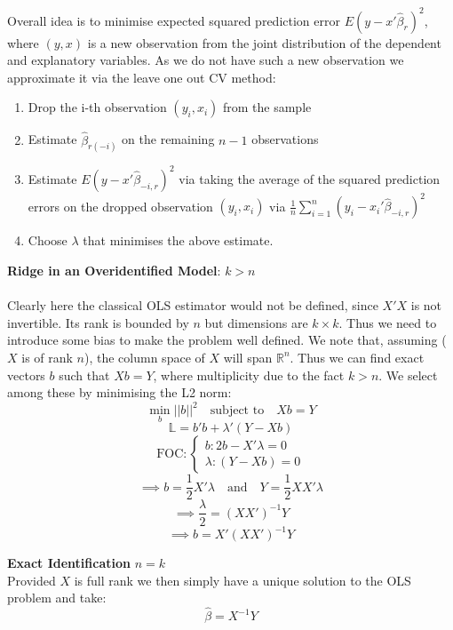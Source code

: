 \documentclass[DIV=14,titlepage=false]{scrreprt}
\begin{document}
Overall idea is to minimise expected squared prediction error \(E(y-x'\hat{\beta}_r)^2\), where \((y,x)\) is a new observation from the joint distribution of the dependent and explanatory variables.
As we do not have such a new observation we approximate it via the leave one out CV method:

\begin{enumerate}
    \item Drop the i-th observation \((y_i, x_i)\) from the sample
    \item Estimate \(\hat{\beta}_{r(-i)}\) on the remaining \(n-1\) observations
    \item Estimate \(E(y-x'\hat{\beta}_{-i,r})^2\) via taking the average of the squared prediction errors on the dropped observation \((y_i, x_i)\) via \(\frac{1}{n}\sum_{i=1}^{n}(y_i-x_i'\hat{\beta}_{-i,r})^2\)
    \item Choose \(\lambda\) that minimises the above estimate.
\end{enumerate}

\vspace{5mm}

\begin{example}
    \textbf{Ridge in an Overidentified Model}: \(k>n\) \\ \\
    Clearly here the classical OLS estimator would not be defined, since \(X'X\) is not invertible. Its rank is bounded by \(n\) but dimensions are \(k\times k\). Thus we need to introduce some bias to make the problem well defined.
    We note that, assuming (\(X\) is of rank \(n\)), the column space of \(X\) will span \(\mathbb{R}^n\). Thus we can find exact vectors \(b\) such that \(Xb=Y\), where multiplicity due to the fact \(k>n\). We select among these by minimising the L2 norm:
    \[\operatorname*{min}_b ||b||^2 \quad \text{subject to} \quad Xb=Y\]
    \[\mathbb{L}=b'b+\lambda'(Y-Xb)\]
    \[\text{FOC}: \begin{cases} b: 2b-X'\lambda=0 \\ \lambda: (Y-Xb)=0\end{cases}\]
    \[\implies b=\frac{1}{2}X'\lambda \quad \text{and} \quad Y=\frac{1}{2}XX'\lambda\]
    \[\implies \frac{\lambda}{2}=(XX')^{-1}Y\]
    \[\implies b=X'(XX')^{-1}Y\]
\end{example}

\begin{note} \textbf{Exact Identification} \(n=k\) \\
    Provided \(X\) is full rank we then simply have a unique solution to the OLS problem and take:
    \[\hat{\beta}=X^{-1}Y\]
\end{note}
\end{document}
